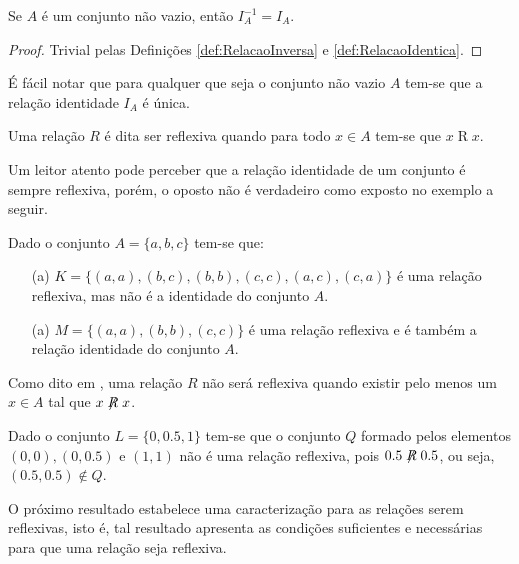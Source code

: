 \begin{proposition}\label{prop:ComplementarDaRelacaoIdentica}
	Se $A$ é um conjunto não vazio, então $I_A^{-1} = I_A$.
\end{proposition}

\begin{proof}
	Trivial pelas Definições \ref{def:RelacaoInversa} e \ref{def:RelacaoIdentica}.
\end{proof}

\begin{remark}\label{rema:UnicidadeDaRelacaoIdentica}
	É fácil notar que para qualquer que seja o conjunto não vazio $A$ tem-se que a relação identidade $I_A$ é única.
\end{remark}

\begin{definition}\label{def:RelacaoReflexiva}
	Uma relação $R$ é dita ser reflexiva quando para todo $x \in A$ tem-se que $x \mathrel{R} x$.
\end{definition}

Um leitor atento pode perceber que a relação identidade de um conjunto é sempre reflexiva, porém, o oposto não é verdadeiro como exposto no exemplo a seguir.

\begin{example}
	Dado o conjunto $A = \{a, b, c\}$ tem-se que: 
	\begin{itemize}
		\item[(a)] $K = \{(a, a), (b, c), (b, b), (c, c), (a, c), (c, a)\}$ é uma relação reflexiva, mas não é a identidade do conjunto $A$.
		\item[(a)] $M = \{(a, a), (b, b), (c, c) \}$ é uma relação reflexiva e é  também a relação identidade do conjunto $A$.
	\end{itemize}
\end{example}

Como dito em \cite{abe1991-TC}, uma relação $R$ não será reflexiva quando existir pelo menos um $x \in A$ tal que $x\centernot{R} x$.

\begin{example}
	Dado o conjunto $L = \{0, 0.5, 1\}$ tem-se que o conjunto $Q$ formado pelos elementos $(0,0), (0,0.5)$ e $(1, 1)$ não é uma relação reflexiva, pois $0.5\centernot{R} 0.5$, ou seja, $(0.5, 0.5) \notin Q$.
\end{example}

O próximo resultado estabelece uma caracterização para as relações serem reflexivas, isto é, tal resultado apresenta as condições suficientes e necessárias para que uma relação seja reflexiva.

